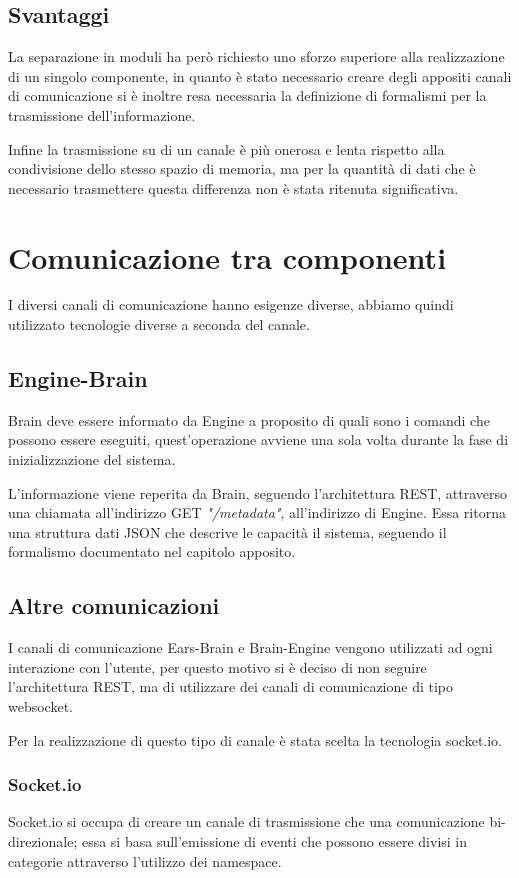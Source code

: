 \documentclass[twoside]{supsistudent}
\begin{document}
\section{Svantaggi}

La separazione in moduli ha però richiesto uno sforzo superiore alla realizzazione di un singolo componente, in quanto è stato necessario creare degli appositi canali di comunicazione si è inoltre resa necessaria la definizione di formalismi per la trasmissione dell'informazione.

Infine la trasmissione su di un canale è più onerosa e lenta rispetto alla condivisione dello stesso spazio di memoria, ma per la quantità di dati che è necessario trasmettere questa differenza non è stata ritenuta significativa.

\chapter{Comunicazione tra componenti}
I diversi canali di comunicazione hanno esigenze diverse, abbiamo quindi utilizzato tecnologie diverse a seconda del canale.

\section{Engine-Brain}
Brain deve essere informato da Engine a proposito di quali sono i comandi che possono essere eseguiti, quest'operazione avviene una sola volta durante la fase di inizializzazione del sistema.

L'informazione viene reperita da Brain, seguendo l'architettura REST, attraverso una chiamata all'indirizzo GET \textit{"/metadata"}, all'indirizzo di Engine. Essa ritorna una struttura dati JSON che descrive le capacità il sistema, seguendo il formalismo documentato nel capitolo apposito.
\section{Altre comunicazioni}
I canali di comunicazione Ears-Brain e Brain-Engine vengono utilizzati ad ogni interazione con l'utente, per questo motivo si è deciso di non seguire l'architettura REST, ma di utilizzare dei canali di comunicazione di tipo websocket.

Per la realizzazione di questo tipo di canale è stata scelta la tecnologia socket.io. 
\subsection{Socket.io}
Socket.io si occupa di creare un canale di trasmissione che una comunicazione bi-direzionale; essa si basa sull'emissione di eventi che possono essere divisi in categorie attraverso l'utilizzo dei namespace.
\end{document}
